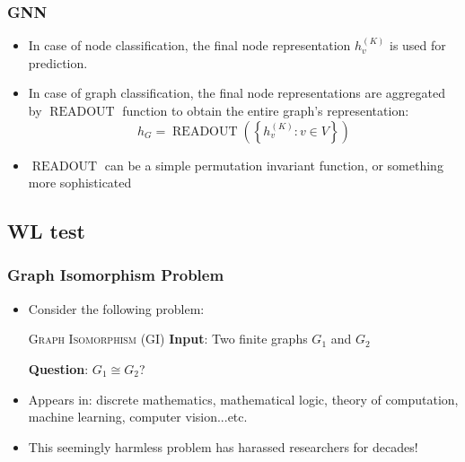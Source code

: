 \documentclass{beamer}
\DeclareMathOperator{\readout}{READOUT}
\begin{document}
\begin{frame}
\frametitle{GNN}

\begin{itemize}
	\item In case of node classification, the final node representation $h_v^{(K)}$ is used for prediction. \pause
	
	\item In case of graph classification, the final node representations are aggregated by $\readout$ function to obtain the entire graph's representation:
	$$h_G = \readout \left( \left\{ h_v^{(K)} : v \in V \right\} \right)$$ \pause
	
	\item $\readout$ can be a simple permutation invariant function, or something more sophisticated
\end{itemize}

\end{frame}


\subsection{WL test}

\begin{frame}
\frametitle{Graph Isomorphism Problem}

\begin{itemize}
	\item Consider the following problem: \pause
	
\begin{block}{\textsc{Graph Isomorphism (GI)}}
{\bf Input}:  Two finite graphs $G_1$ and $G_2$

{\bf Question}: $G_1 \cong G_2$?

\end{block} \pause

	\item Appears in: discrete mathematics, mathematical logic, theory of computation, machine learning, computer vision...etc. \pause
	
	\item This seemingly harmless problem has harassed researchers for decades!
\end{itemize}

\end{frame}
\end{document}
